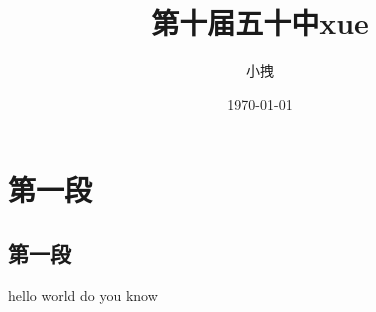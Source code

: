 \documentclass{article}
\title{第十届五十中xue}
\date{\today}
\author{小拽}
\begin{document}
\maketitle
\section{第一段}
\subsection{第一段}
hello world do you know
\end{document}
